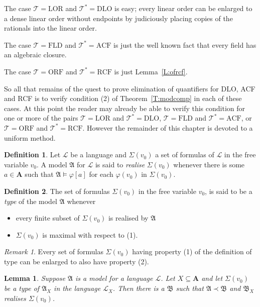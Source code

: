 \documentclass[titlepage, oneside]{amsbook}
\theoremstyle{plain}
\newtheorem{lemma}{Lemma}
\theoremstyle{definition}
\newtheorem{definition}{Definition}
\theoremstyle{remark}
\newtheorem*{rem}{Remark}
\newcommand{\sv}[1][v_0]{\ensuremath{\Sigma ( #1) }}
\newcommand{\theory}{\ensuremath{\mathcal{T}}}
\newcommand{\tstar}{\ensuremath{\mathcal{T}^{\ast}}}
\newcommand{\lan}{\ensuremath{\mathcal{L}}}
\newcommand{\seq}{\ensuremath{\subseteq}}
\newcommand{\ma}{\ensuremath{\mathfrak{A}}}
\newcommand{\mb}{\ensuremath{\mathfrak{B}}}
\newcommand{\amodphi}{\ensuremath{\mathfrak A \models \varphi}}
\begin{document}
The case $\theory = \mbox{LOR}$ and $\tstar = \mbox{DLO}$ is easy;
every linear order can be enlarged to a dense linear order without
endpoints by judiciously placing copies of the rationals into the linear
order.

The case $\theory = \mbox{FLD}$ and $\tstar = \mbox{ACF}$ is just the well
known fact that every field has an algebraic closure.

The case $\theory = \mbox{ORF}$ and $\tstar = \mbox{RCF}$ is just
Lemma~\ref{L:ofrcf}.

So all that remains of the quest to prove elimination of quantifiers
for DLO, ACF and RCF is to verify condition (2) of
Theorem~\ref{T:modcomp} in each of these cases. At this point the reader may already be able to verify this condition for one or more of the pairs 
$\theory = \mbox{LOR}$ and $\tstar = \mbox{DLO}$,
$\theory = \mbox{FLD}$ and $\tstar = \mbox{ACF}$, or 
$\theory = \mbox{ORF}$ and $\tstar = \mbox{RCF}$.  
However the remainder of this chapter is devoted to a uniform method.



\begin{definition}
%
 Let $\lan$ be a language and $\sv$ a set of formulas
of 
$\lan$ in the free variable $v_0$. A model $\ma$ for $\lan$ is said to 
\emph{realise} $\sv$ whenever there is some $a \in \mathbf A$ such that 
$\amodphi [ a] $ for each $\varphi (v_0) $ in $\sv$.

\end{definition}

\begin{definition}
%
 The set of formulas $\sv$ in the free variable $v_0$,  is said to be a
\emph{type}
of the model $\ma$ whenever 
\begin{itemize}
\item[(1)] every finite subset of $\sv$ is realised by $\ma$
\item[(2)] $\sv$ is maximal with respect to (1).
\end{itemize}
\end{definition}



\begin{rem} Every set of formulas $\Sigma (v_0)$ having property (1) of
the definition of type can be enlarged to also have property (2).
\end{rem}


\begin{lemma}\label{L:type} Suppose  $\ma$ is a model for a language $\lan$. 
Let $X  \seq \mathbf A$ and let $\sv$ be a type of $\ma_X$ in the language
$\lan_X$.
Then there is a $\mb$ such that 
$\ma \prec \mb$ and $\mb_X$ realises $\sv$.
\end{lemma}
\end{document}
